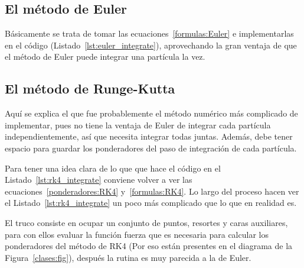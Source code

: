 \subsection{El método de Euler}
Básicamente se trata de tomar las ecuaciones~\eqref{formulas:Euler} e implementarlas en el código (Listado~\ref{lst:euler_integrate}), aprovechando la gran ventaja de que el método de Euler puede integrar una partícula la vez.


\subsection{El método de Runge-Kutta}
Aquí se explica el que fue probablemente el método numérico más complicado de implementar, pues no tiene la ventaja de Euler de integrar cada partícula independientemente, así que necesita integrar todas juntas.
Además, debe tener espacio para guardar los ponderadores del paso de integración de cada partícula.

Para tener una idea clara de lo que que hace el código en el Listado~\ref{lst:rk4_integrate} conviene volver a ver las ecuaciones~\eqref{ponderadores:RK4} y~\eqref{formulas:RK4}.
Lo largo del proceso hacen ver el Listado~\ref{lst:rk4_integrate} un poco más complicado que lo que en realidad es.


El truco consiste en ocupar un conjunto de puntos, resortes y caras auxiliares, para con ellos evaluar la función fuerza que es necesaria para calcular los ponderadores del método de RK4 (Por eso están presentes en el diagrama de la Figura~\ref{clases:fig}), después la rutina es muy parecida a la de Euler.

